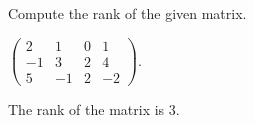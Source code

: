 \documentclass{ximera}
\begin{document}
\matlabproblemlabel

\noindent Compute the rank of the given matrix.

\begin{computerExercise} \label{c2.4.4b}
$\left(\begin{array}{rrrr} 2 & 1 & 0 & 1\\
	-1 & 3 & 2 & 4\\ 5 & -1 & 2 & -2\end{array}\right)$.

\begin{solution}
The rank of the matrix is $3$.

\end{solution}
\end{computerExercise}
\end{document}
